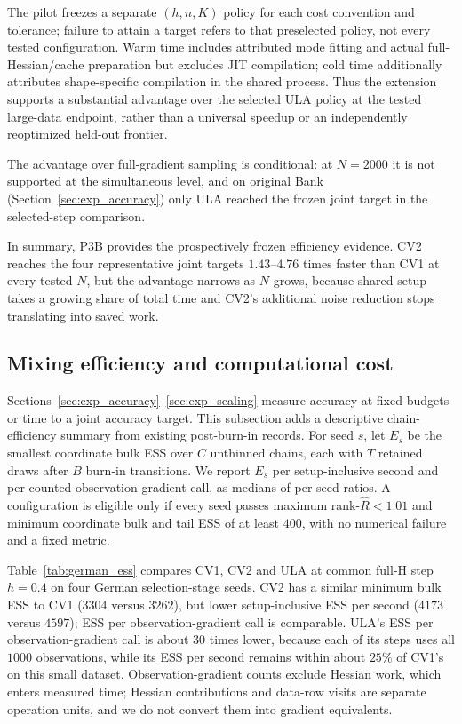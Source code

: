 The pilot freezes a separate $(h,n,K)$ policy for each cost convention and tolerance; failure to attain a target refers to that preselected policy, not every tested configuration. Warm time includes attributed mode fitting and actual full-Hessian/cache preparation but excludes JIT compilation; cold time additionally attributes shape-specific compilation in the shared process. Thus the extension supports a substantial advantage over the selected ULA policy at the tested large-data endpoint, rather than a universal speedup or an independently reoptimized held-out frontier. \par\begin{samepage}
The advantage over full-gradient sampling is conditional: at $N=2000$ it is not supported at the simultaneous level, and on original Bank (Section~\ref{sec:exp_accuracy}) only ULA reached the frozen joint target in the selected-step comparison.
\par\end{samepage}

In summary, P3B provides the prospectively frozen efficiency evidence. CV2 reaches the four representative joint targets $1.43$--$4.76$ times faster than CV1 at every tested $N$, but the advantage narrows as $N$ grows, because shared setup takes a growing share of total time and CV2's additional noise reduction stops translating into saved work.

\FloatBarrier
\subsection{Mixing efficiency and computational cost}\label{sec:exp_ess}
Sections~\ref{sec:exp_accuracy}--\ref{sec:exp_scaling} measure accuracy at fixed budgets or time to a joint accuracy target. This subsection adds a descriptive chain-efficiency summary from existing post-burn-in records. For seed $s$, let $E_s$ be the smallest coordinate bulk ESS over $C$ unthinned chains, each with $T$ retained draws after $B$ burn-in transitions. We report $E_s$ per setup-inclusive second and per counted observation-gradient call, as medians of per-seed ratios. A configuration is eligible only if every seed passes maximum rank-$\widehat R<1.01$ and minimum coordinate bulk and tail ESS of at least $400$, with no numerical failure and a fixed metric.

Table~\ref{tab:german_ess} compares CV1, CV2 and ULA at common full-H step $h=0.4$ on four German selection-stage seeds. CV2 has a similar minimum bulk ESS to CV1 ($3304$ versus $3262$), but lower setup-inclusive ESS per second ($4173$ versus $4597$); ESS per observation-gradient call is comparable. ULA's ESS per observation-gradient call is about $30$ times lower, because each of its steps uses all $1000$ observations, while its ESS per second remains within about $25\%$ of CV1's on this small dataset. Observation-gradient counts exclude Hessian work, which enters measured time; Hessian contributions and data-row visits are separate operation units, and we do not convert them into gradient equivalents.

